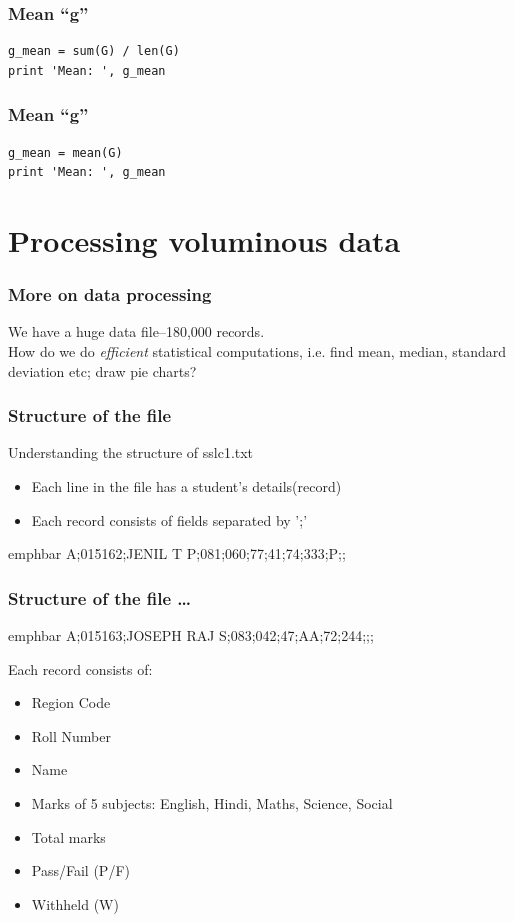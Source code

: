 \documentclass[14pt,compress]{beamer}
\newcommand{\emphbar}[1]
{\begin{beamercolorbox}[rounded=true]{emphbar} 
      {#1}
 \end{beamercolorbox}
}
\newcounter{time}
\newcommand{\inctime}[1]{\addtocounter{time}{#1}{\tiny \thetime\ m}}
\begin{document}
\begin{frame}[fragile]
  \frametitle{Mean ``g''}
  \begin{lstlisting}
g_mean = sum(G) / len(G)
print 'Mean: ', g_mean
  \end{lstlisting}
\end{frame}

\begin{frame}[fragile]
  \frametitle{Mean ``g''}
  \begin{lstlisting}
g_mean = mean(G)
print 'Mean: ', g_mean
  \end{lstlisting}
  \inctime{10}
\end{frame}

\section{Processing voluminous data}
\begin{frame}
  \frametitle{More on data processing}
  \begin{block}{}
    We have a huge data file--180,000 records.\\How do we do \emph{efficient} statistical computations, i.e. find mean, median, standard deviation etc; draw pie charts?
  \end{block}
\end{frame}

\begin{frame}
  \frametitle{Structure of the file}
  Understanding the structure of sslc1.txt
  \begin{itemize}
    \item Each line in the file has a student's details(record)
    \item Each record consists of fields separated by ';'
  \end{itemize}
\emphbar{A;015162;JENIL T P;081;060;77;41;74;333;P;;}
\end{frame}

\begin{frame}
  \frametitle{Structure of the file \ldots}
\emphbar{A;015163;JOSEPH RAJ S;083;042;47;AA;72;244;;;}
  Each record consists of:
  \begin{itemize}
    \item Region Code
    \item Roll Number
    \item Name
    \item Marks of 5 subjects: English, Hindi, Maths, Science, Social
    \item Total marks
    \item Pass/Fail (P/F)
    \item Withheld (W)
  \end{itemize}
  \inctime{5}
\end{frame}
\end{document}
